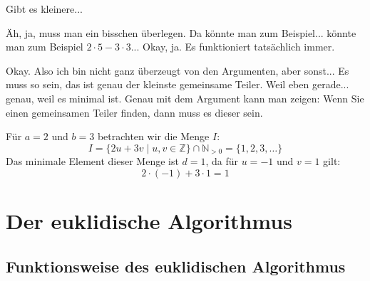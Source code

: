 \begin{student-interaction}[Studentenfrage]
Gibt es kleinere...
\end{student-interaction}

\begin{spoken-clean}[00:27:35 - 00:28:27]
Äh, ja, muss man ein bisschen überlegen. Da könnte man zum Beispiel... könnte man zum Beispiel $2 \cdot 5 - 3 \cdot 3$... Okay, ja. Es funktioniert tatsächlich immer. 

Okay. Also ich bin nicht ganz überzeugt von den Argumenten, aber sonst...  Es muss so sein, das ist genau der kleinste gemeinsame Teiler. Weil eben gerade... genau, weil es minimal ist. Genau mit dem Argument kann man zeigen: Wenn Sie einen gemeinsamen Teiler finden, dann muss es dieser sein.
\end{spoken-clean}

\begin{math-stroke}
Für $a = 2$ und $b = 3$ betrachten wir die Menge $I$:
\[ I = \{ 2u + 3v \mid u, v \in \mathbb{Z} \} \cap \mathbb{N}_{>0} = \{1, 2, 3, \dots\} \]
Das minimale Element dieser Menge ist $d = 1$, da für $u = -1$ und $v = 1$ gilt:
\[ 2 \cdot (-1) + 3 \cdot 1 = 1 \]
\end{math-stroke}

\section{Der euklidische Algorithmus}

\subsection{Funktionsweise des euklidischen Algorithmus}

